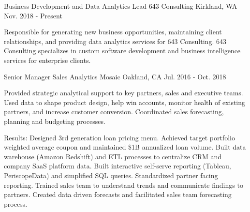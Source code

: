 


\begin{cventries}

\cventry
{Business Development and Data Analytics Lead} %
{643 Consulting} %
{Kirkland, WA} %
{Nov. 2018 - Present} %
{ %
\begin{cvitems}
\item {Responsible for generating new business opportunities, maintaining client relationships, and providing data analytics services for 643 Consulting. 643 Consulting specializes in custom software development and business intelligence services for enterprise clients.}
\end{cvitems}
}
	
\cventry
{Senior Manager Sales Analytics} %
{Mosaic} %
{Oakland, CA} %
{Jul. 2016 - Oct. 2018} %
{ %
\begin{cvitems}
\item {Provided strategic analytical support to key partners, sales and executive teams. Used data to shape product design, help win accounts, monitor health of existing partners, and increase customer conversion. Coordinated sales forecasting, planning and budgeting processes.}
\end{cvitems}
}
\begin{cvitemsnb}
\item {Results: Designed 3rd generation loan pricing menu. Achieved target portfolio weighted average coupon and maintained \$1B annualized loan volume. Built data warehouse (Amazon Redshift) and ETL processes to centralize CRM and company SaaS platform data. Built interactive self-serve reporting (Tableau, PeriscopeData) and simplified SQL queries. Standardized partner facing reporting. Trained sales team to understand trends and communicate findings to partners. Created data driven forecasts and facilitated sales team forecasting process.}
\end{cvitemsnb}
	

\end{cventries}
